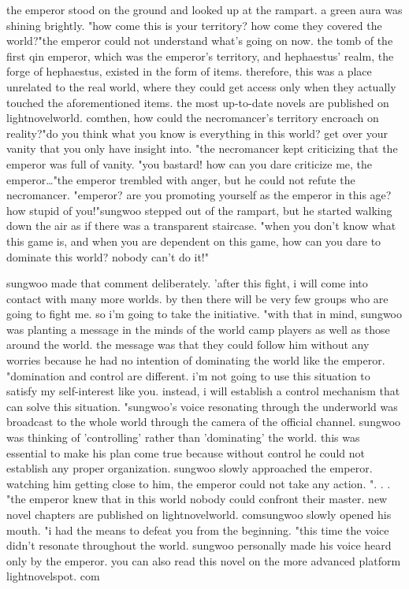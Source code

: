 the emperor stood on the ground and looked up at the rampart.
 a green aura was shining brightly.
"how come this is your territory? how come they covered the world?"the emperor could not understand what's going on now.
 the tomb of the first qin emperor, which was the emperor's territory, and hephaestus' realm, the forge of hephaestus, existed in the form of items.
 therefore, this was a place unrelated to the real world, where they could get access only when they actually touched the aforementioned items.
the most up-to-date novels are published on lightnov­elworld.
comthen, how could the necromancer's territory encroach on reality?"do you think what you know is everything in this world? get over your vanity that you only have insight into.
"the necromancer kept criticizing that the emperor was full of vanity.
"you bastard! how can you dare criticize me, the emperor…"the emperor trembled with anger, but he could not refute the necromancer.
"emperor? are you promoting yourself as the emperor in this age? how stupid of you!"sungwoo stepped out of the rampart, but he started walking down the air as if there was a transparent staircase.
"when you don't know what this game is, and when you are dependent on this game, how can you dare to dominate this world? nobody can't do it!"

sungwoo made that comment deliberately.
'after this fight, i will come into contact with many more worlds.
 by then there will be very few groups who are going to fight me.
 so i'm going to take the initiative.
"with that in mind, sungwoo was planting a message in the minds of the world camp players as well as those around the world.
the message was that they could follow him without any worries because he had no intention of dominating the world like the emperor.
 "domination and control are different.
 i'm not going to use this situation to satisfy my self-interest like you.
 instead, i will establish a control mechanism that can solve this situation.
"sungwoo's voice resonating through the underworld was broadcast to the whole world through the camera of the official channel.
sungwoo was thinking of 'controlling' rather than 'dominating' the world.
 this was essential to make his plan come true because without control he could not establish any proper organization.
sungwoo slowly approached the emperor.
 watching him getting close to him, the emperor could not take any action.
".
.
.
"the emperor knew that in this world nobody could confront their master.
new novel chapters are published on lightnov­elworld.
comsungwoo slowly opened his mouth.
"i had the means to defeat you from the beginning.
"this time the voice didn't resonate throughout the world.
 sungwoo personally made his voice heard only by the emperor.
 you can also read this novel on the more advanced platform lightnovelspot.
com

 